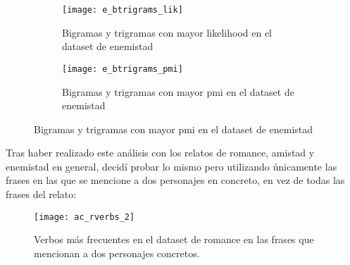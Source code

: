 \documentclass{pre-tfg}
\begin{document}
\begin{figure}
	\centering
	\begin{subfigure}{\textwidth}
		\texttt{[image: e\_btrigrams\_lik]}
		\caption{Bigramas y trigramas con mayor likelihood en el dataset de enemistad}
		\label{fig:e_btrigram_lik}
		
	\end{subfigure}
	\begin{subfigure}{\textwidth}
		\texttt{[image: e\_btrigrams\_pmi]}
		\caption{Bigramas y trigramas con mayor pmi en el dataset de enemistad}
		\label{fig:e_btrigram_pmi}
	\end{subfigure}
	
	
\end{figure}





Tras haber realizado este análisis con los relatos de romance, amistad y enemistad en general, decidí probar lo mismo pero utilizando únicamente las frases en las que se mencione a dos personajes en concreto, en vez de todas las frases del relato:

\begin{figure}
	\centering
	\texttt{[image: ac\_rverbs\_2]}
	\caption{Verbos más frecuentes en el dataset de romance en las frases que mencionan a dos personajes concretos.}
	\label{fig:r_verb_freq_in_character_mentions}
\end{figure}
\end{document}
